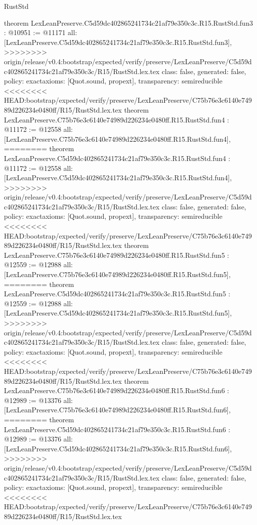\begin{lexlean}{RustStd}
\begin{coremodule}
{\begin{coremodule}
{{{{{{theorem LexLeanPreserve.C5d59dc402865241734c21af79e350c3c.R15.RustStd.fun3 : @10951 := @11171 {
  all: [LexLeanPreserve.C5d59dc402865241734c21af79e350c3c.R15.RustStd.fun3],
>>>>>>>> origin/release/v0.4:bootstrap/expected/verify/preserve/LexLeanPreserve/C5d59dc402865241734c21af79e350c3c/R15/RustStd.lex.tex
  class: false,
  generated: false,
  policy: exact{axioms: [Quot.sound, propext]},
  transparency: semireducible
}
<<<<<<<< HEAD:bootstrap/expected/verify/preserve/LexLeanPreserve/C75b76e3c6140e74989d226234e0480ff/R15/RustStd.lex.tex
theorem LexLeanPreserve.C75b76e3c6140e74989d226234e0480ff.R15.RustStd.fun4 : @11172 := @12558 {
  all: [LexLeanPreserve.C75b76e3c6140e74989d226234e0480ff.R15.RustStd.fun4],
========
theorem LexLeanPreserve.C5d59dc402865241734c21af79e350c3c.R15.RustStd.fun4 : @11172 := @12558 {
  all: [LexLeanPreserve.C5d59dc402865241734c21af79e350c3c.R15.RustStd.fun4],
>>>>>>>> origin/release/v0.4:bootstrap/expected/verify/preserve/LexLeanPreserve/C5d59dc402865241734c21af79e350c3c/R15/RustStd.lex.tex
  class: false,
  generated: false,
  policy: exact{axioms: [Quot.sound, propext]},
  transparency: semireducible
}
<<<<<<<< HEAD:bootstrap/expected/verify/preserve/LexLeanPreserve/C75b76e3c6140e74989d226234e0480ff/R15/RustStd.lex.tex
theorem LexLeanPreserve.C75b76e3c6140e74989d226234e0480ff.R15.RustStd.fun5 : @12559 := @12988 {
  all: [LexLeanPreserve.C75b76e3c6140e74989d226234e0480ff.R15.RustStd.fun5],
========
theorem LexLeanPreserve.C5d59dc402865241734c21af79e350c3c.R15.RustStd.fun5 : @12559 := @12988 {
  all: [LexLeanPreserve.C5d59dc402865241734c21af79e350c3c.R15.RustStd.fun5],
>>>>>>>> origin/release/v0.4:bootstrap/expected/verify/preserve/LexLeanPreserve/C5d59dc402865241734c21af79e350c3c/R15/RustStd.lex.tex
  class: false,
  generated: false,
  policy: exact{axioms: [Quot.sound, propext]},
  transparency: semireducible
}
<<<<<<<< HEAD:bootstrap/expected/verify/preserve/LexLeanPreserve/C75b76e3c6140e74989d226234e0480ff/R15/RustStd.lex.tex
theorem LexLeanPreserve.C75b76e3c6140e74989d226234e0480ff.R15.RustStd.fun6 : @12989 := @13376 {
  all: [LexLeanPreserve.C75b76e3c6140e74989d226234e0480ff.R15.RustStd.fun6],
========
theorem LexLeanPreserve.C5d59dc402865241734c21af79e350c3c.R15.RustStd.fun6 : @12989 := @13376 {
  all: [LexLeanPreserve.C5d59dc402865241734c21af79e350c3c.R15.RustStd.fun6],
>>>>>>>> origin/release/v0.4:bootstrap/expected/verify/preserve/LexLeanPreserve/C5d59dc402865241734c21af79e350c3c/R15/RustStd.lex.tex
  class: false,
  generated: false,
  policy: exact{axioms: [Quot.sound, propext]},
  transparency: semireducible
}
<<<<<<<< HEAD:bootstrap/expected/verify/preserve/LexLeanPreserve/C75b76e3c6140e74989d226234e0480ff/R15/RustStd.lex.tex
}}}}}}}}}
\end{coremodule}}
\end{coremodule}
\end{lexlean}
